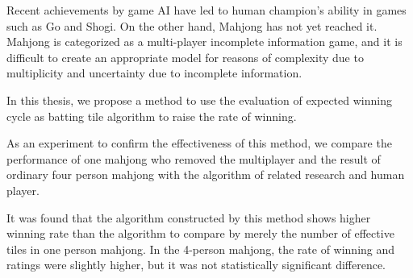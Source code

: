 \begin{eabstract}

Recent achievements by game AI have led to human champion's ability in games such as Go and Shogi. On the other hand, Mahjong has not yet reached it. Mahjong is categorized as a multi-player incomplete information game, and it is difficult to create an appropriate model for reasons of complexity due to multiplicity and uncertainty due to incomplete information.

In this thesis, we propose a method to use the evaluation of expected winning cycle as batting tile algorithm to raise the rate of winning.

As an experiment to confirm the effectiveness of this method, we compare the performance of one mahjong who removed the multiplayer and the result of ordinary four person mahjong with the algorithm of related research and human player.

It was found that the algorithm constructed by this method shows higher winning rate than the algorithm to compare by merely the number of effective tiles in one person mahjong. In the 4-person mahjong, the rate of winning and ratings were slightly higher, but it was not statistically significant difference.

\end{eabstract}
